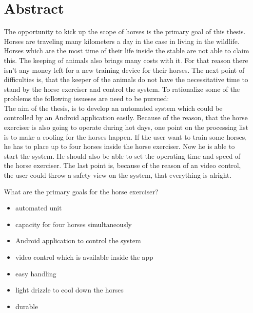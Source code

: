 \newpage

\section*{Abstract}
\label{sec:abstractIntroduction}

The opportunity to kick up the scope of horses is the primary goal of this thesis. Horses are traveling many kilometers a day in the case in living in the wildlife. Horses which are the most time of their life inside the stable are not able to claim this. The keeping of animals also brings many costs with it. For that reason there isn't any money left for a new training device for their horses. The next point of difficulties is, that the keeper of the animals do not have the necessitative time to stand by the horse exerciser and control the system. To rationalize some of the problems the following issueses are need to be pursued: \\
The aim of the thesis, is to develop an automated system which could be controlled by an Android application easily. Because of the reason, that the horse exerciser is also going to operate during hot days, one point on the processing list is to make a cooling for the horses happen. If the user want to train some horses, he has to place up to four horses inside the horse exerciser. Now he is able to start the system. He should also be able to set the operating time and speed of the horse exerciser. The last point is, because of the reason of an video control, the user could throw a safety view on the system, that everything is alright.

What are the primary goals for the horse exerciser?

\begin{itemize}
	\item{automated unit}
	\item{capacity for four horses simultaneously}
	\item{Android application to control the system}
	\item{video control which is available inside the app}
	\item{easy handling}
	\item{light drizzle to cool down the horses}
	\item{durable}
\end{itemize} 


\clearpage

\newpage
\thispagestyle{empty}
\mbox{}

\clearpage

